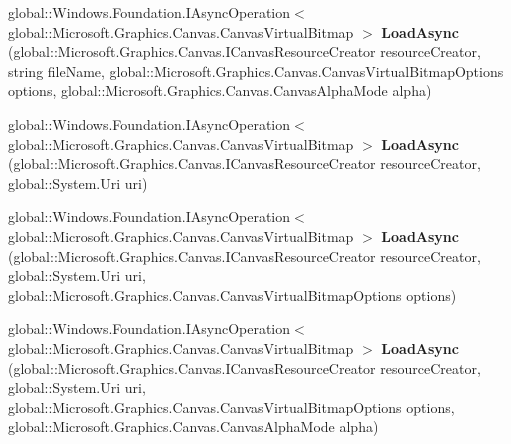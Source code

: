 \begin{DoxyCompactItemize}
\item 
\mbox{\label{interface_microsoft_1_1_graphics_1_1_canvas_1_1_i_canvas_virtual_bitmap_statics_af2af584f62356eb886a700899215d4a6}} 
global\+::\+Windows.\+Foundation.\+I\+Async\+Operation$<$ global\+::\+Microsoft.\+Graphics.\+Canvas.\+Canvas\+Virtual\+Bitmap $>$ {\bfseries Load\+Async} (global\+::\+Microsoft.\+Graphics.\+Canvas.\+I\+Canvas\+Resource\+Creator resource\+Creator, string file\+Name, global\+::\+Microsoft.\+Graphics.\+Canvas.\+Canvas\+Virtual\+Bitmap\+Options options, global\+::\+Microsoft.\+Graphics.\+Canvas.\+Canvas\+Alpha\+Mode alpha)
\item 
\mbox{\label{interface_microsoft_1_1_graphics_1_1_canvas_1_1_i_canvas_virtual_bitmap_statics_a230e794a4930f665b4ac7d220c2671da}} 
global\+::\+Windows.\+Foundation.\+I\+Async\+Operation$<$ global\+::\+Microsoft.\+Graphics.\+Canvas.\+Canvas\+Virtual\+Bitmap $>$ {\bfseries Load\+Async} (global\+::\+Microsoft.\+Graphics.\+Canvas.\+I\+Canvas\+Resource\+Creator resource\+Creator, global\+::\+System.\+Uri uri)
\item 
\mbox{\label{interface_microsoft_1_1_graphics_1_1_canvas_1_1_i_canvas_virtual_bitmap_statics_ae4cad80705e97acdc853863be82a2edd}} 
global\+::\+Windows.\+Foundation.\+I\+Async\+Operation$<$ global\+::\+Microsoft.\+Graphics.\+Canvas.\+Canvas\+Virtual\+Bitmap $>$ {\bfseries Load\+Async} (global\+::\+Microsoft.\+Graphics.\+Canvas.\+I\+Canvas\+Resource\+Creator resource\+Creator, global\+::\+System.\+Uri uri, global\+::\+Microsoft.\+Graphics.\+Canvas.\+Canvas\+Virtual\+Bitmap\+Options options)
\item 
\mbox{\label{interface_microsoft_1_1_graphics_1_1_canvas_1_1_i_canvas_virtual_bitmap_statics_ac1747ce10fe0cd80d92ea79b088c0fa3}} 
global\+::\+Windows.\+Foundation.\+I\+Async\+Operation$<$ global\+::\+Microsoft.\+Graphics.\+Canvas.\+Canvas\+Virtual\+Bitmap $>$ {\bfseries Load\+Async} (global\+::\+Microsoft.\+Graphics.\+Canvas.\+I\+Canvas\+Resource\+Creator resource\+Creator, global\+::\+System.\+Uri uri, global\+::\+Microsoft.\+Graphics.\+Canvas.\+Canvas\+Virtual\+Bitmap\+Options options, global\+::\+Microsoft.\+Graphics.\+Canvas.\+Canvas\+Alpha\+Mode alpha)

\end{DoxyCompactItemize}
